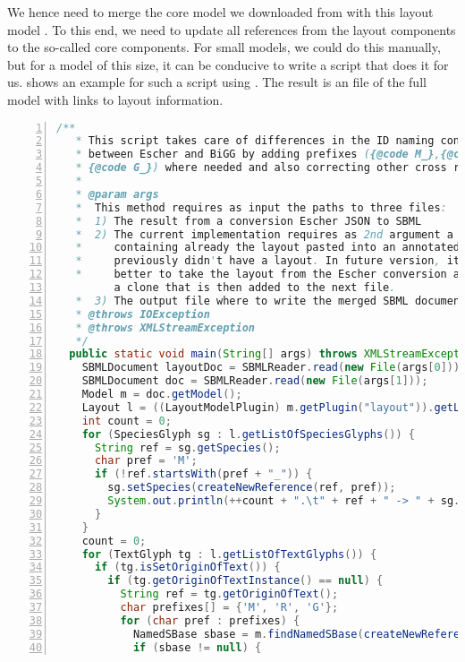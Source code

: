We hence need to merge the core model we downloaded from \BiGG with this \SBML layout model \citep{Gauges2015}.
To this end, we need to update all references from the layout components to the so-called \SBML core components.
For small models, we could do this manually, but for a model of this size, it can be conducive to write a script that does it for us.
 shows an example for such a script using \JSBML \citep{Rodriguez2015}.
The result is an \SBML file of the full model with links to layout information.
\begin{lstlisting}[language=Java,numbers=left,captionpos=t,caption={Example script for merging an SBML layout into a model},label={lst:modelMerge}]
  /**
   * This script takes care of differences in the ID naming conventions
   * between Escher and BiGG by adding prefixes ({@code M_},{@code R_}, or
   * {@code G_}) where needed and also correcting other cross references.
   *
   * @param args
   *  This method requires as input the paths to three files:
   *  1) The result from a conversion Escher JSON to SBML
   *  2) The current implementation requires as 2nd argument a file
   *     containing already the layout pasted into an annotated model that
   *     previously didn't have a layout. In future version, it would be
   *     better to take the layout from the Escher conversion and to create
         a clone that is then added to the next file.
   *  3) The output file where to write the merged SBML document.
   * @throws IOException
   * @throws XMLStreamException
   */
  public static void main(String[] args) throws XMLStreamException, IOException {
    SBMLDocument layoutDoc = SBMLReader.read(new File(args[0]));
    SBMLDocument doc = SBMLReader.read(new File(args[1]));
    Model m = doc.getModel();
    Layout l = ((LayoutModelPlugin) m.getPlugin("layout")).getListOfLayouts().get(0);
    int count = 0;
    for (SpeciesGlyph sg : l.getListOfSpeciesGlyphs()) {
      String ref = sg.getSpecies();
      char pref = 'M';
      if (!ref.startsWith(pref + "_")) {
        sg.setSpecies(createNewReference(ref, pref));
        System.out.println(++count + ".\t" + ref + " -> " + sg.getSpecies());
      }
    }
    count = 0;
    for (TextGlyph tg : l.getListOfTextGlyphs()) {
      if (tg.isSetOriginOfText()) {
        if (tg.getOriginOfTextInstance() == null) {
          String ref = tg.getOriginOfText();
          char prefixes[] = {'M', 'R', 'G'};
          for (char pref : prefixes) {
            NamedSBase sbase = m.findNamedSBase(createNewReference(ref, pref));
            if (sbase != null) {

\end{lstlisting}
